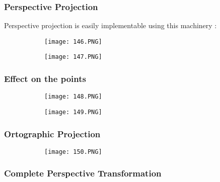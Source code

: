 \documentclass{article}
\begin{document}
\vspace{40mm}

\subsubsection{Perspective Projection}

Perspective projection is easily implementable using this machinery : 

\begin{figure}[ht!]
  \centering
  \begin{subfigure}[b]{0.49\linewidth}
    \texttt{[image: 146.PNG]}
  \end{subfigure}
  \begin{subfigure}[b]{0.3\textwidth}
         \centering
         \texttt{[image: 147.PNG]}
     \end{subfigure}
\end{figure}

\subsubsection{Effect on the points}

\begin{figure}[ht!]
  \centering
  \begin{subfigure}[b]{0.49\linewidth}
    \texttt{[image: 148.PNG]}
  \end{subfigure}
  \begin{subfigure}[b]{0.5\textwidth}
         \centering
         \texttt{[image: 149.PNG]}
     \end{subfigure}
\end{figure}

\subsubsection{Ortographic Projection}

\begin{figure}[ht!]
  \centering
  \begin{subfigure}[b]{0.4\linewidth}
    \texttt{[image: 150.PNG]}
  \end{subfigure}
\end{figure}

\subsubsection{Complete Perspective Transformation}
\end{document}
